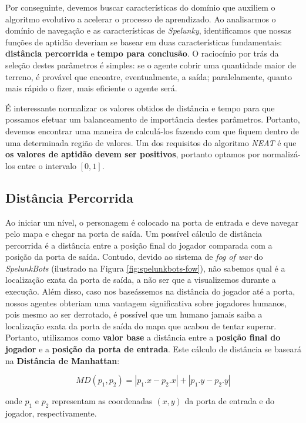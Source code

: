 Por conseguinte, devemos buscar características do domínio que auxiliem o
algoritmo evolutivo a acelerar o processo de aprendizado. Ao analisarmos o
domínio de navegação e as características de \textit{Spelunky}, identificamos
que nossas funções de aptidão deveriam se basear em duas características
fundamentais: \textbf{distância percorrida} e \textbf{tempo para conclusão}. O
raciocínio por trás da seleção destes parâmetros é simples: se o agente cobrir
uma quantidade maior de terreno, é provável que encontre, eventualmente, a
saída; paralelamente, quanto mais rápido o fizer, mais eficiente o agente será.

É interessante normalizar os valores obtidos de distância e tempo para que
possamos efetuar um balanceamento de importância destes parâmetros. Portanto,
devemos encontrar uma maneira de calculá-los fazendo com que fiquem dentro de
uma determinada região de valores. Um dos requisitos do algoritmo \textit{NEAT}
é que \textbf{os valores de aptidão devem ser positivos}, portanto optamos por
normalizá-los entre o intervalo $[0, 1]$.

\subsection{Distância Percorrida}
Ao iniciar um nível, o personagem é colocado na porta de entrada e deve navegar
pelo mapa e chegar na porta de saída. Um possível cálculo de distância
percorrida é a distância entre a posição final do jogador comparada com a
posição da porta de saída. Contudo, devido ao sistema de \textit{fog of war} do
\textit{SpelunkBots} (ilustrado na Figura \ref{fig:spelunkbots-fow}), não
sabemos qual é a localização exata da porta de saída, a não ser que a
visualizemos durante a execução. Além disso, caso nos baseássemos na distância
do jogador até a porta, nossos agentes obteriam uma vantagem significativa sobre
jogadores humanos, pois mesmo ao ser derrotado, é possível que um humano jamais
saiba a localização exata da porta de saída do mapa que acabou de tentar
superar. Portanto, utilizamos como \textbf{valor base} a distância entre a
\textbf{posição final do jogador} e a \textbf{posição da porta de entrada}.
Este cálculo de distância se baseará na \textbf{Distância de Manhattan}:

\begin{equation}
	\label{eq:manhattan-distance}
	MD(p_1,p_2) = |p_1.x - p_2.x| + |p_1.y - p_2.y|
\end{equation}

onde $p_1$ e $p_2$ representam as coordenadas $(x,y)$ da porta de entrada e do
jogador, respectivamente. 

